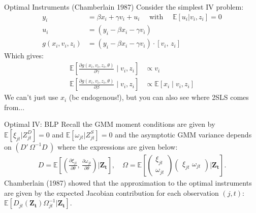 \documentclass[aspectratio=169,11pt]{beamer}
\begin{document}
\begin{frame}{Optimal Instruments (Chamberlain 1987)}
Consider the simplest IV problem:
\begin{align*}
y_i &= \beta x_i + \gamma v_i + u_i \quad \text{ with } \quad \mathbb{E}[u_i | v_i, z_i] =0 \\
u_i &= \left(y_i - \beta x_i - \gamma v_i \right) \\
g(x_i,v_i,z_i) &= \left(y_i - \beta x_i - \gamma v_i \right) \cdot [v_i,\, z_i]
 \end{align*}
 Which gives:
\begin{align*}
\mathbb{E}\left[\frac{\partial g(x_i,v_i, z_i,\theta)}{\partial \gamma} \mid v_i, z_i \right] &\propto v_i\\
\mathbb{E}\left[\frac{\partial g(x_i,v_i, z_i,\theta)}{\partial \beta} \mid v_i, z_i \right] &
\propto \mathbb{E}\left[x_i \mid v_i, z_i \right]
\end{align*}
We can't just use $x_i$ (bc endogenous!), but you can also see where 2SLS comes from...
\end{frame}



\begin{frame}{Optimal IV: BLP}
Recall the GMM moment conditions are given by $\mathbb{E}[\xi_{jt} | Z_{jt}^D]=0$ and $\mathbb{E}[\omega_{jt} | Z_{jt}^S]=0$ and the asymptotic GMM variance depends on $(D'\, \Omega^{-1} D\,)$ where the expressions are given below:
\begin{align*}
    D=\mathbb{E}\left[
    \left(\frac{\partial \xi_{jt}}{\partial \theta}, \,
    \frac{\partial \omega_{jt}}{\partial \theta} \right)
| \symbf{Z_t} \right], \quad 
\Omega = \mathbb{E}\left[
\begin{pmatrix}
    \xi_{jt} \\
    \omega_{jt}
\end{pmatrix}
\begin{pmatrix}
    \xi_{jt}\, \,
    \omega_{jt}
\end{pmatrix}
| \symbf{Z_t} \right].
\end{align*}
Chamberlain (1987) showed that the approximation to the optimal instruments are given by the expected Jacobian contribution for each observation $(j,t)$: $\mathbb{E}[D_{jt}(\symbf{Z_t}) \Omega_{jt}^{-1} | \symbf{Z_t}]$.
\end{frame}
\end{document}

